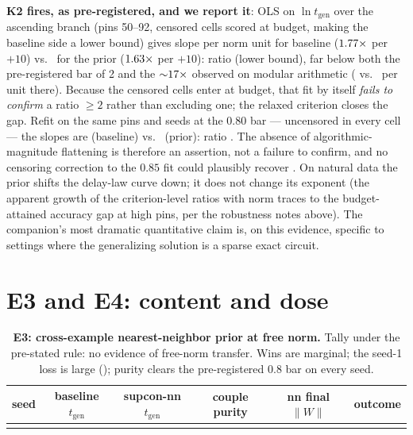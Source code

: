 \documentclass[11pt]{article}
\newcommand{\tgen}{t_{\mathrm{gen}}}
\newcommand{\W}{\lVert W\rVert}
\begin{document}
\textbf{K2 fires, as pre-registered, and we report it}: OLS on $\ln \tgen$ over the ascending
branch (pins 50--92, censored cells scored at budget, making the baseline side a lower bound)
gives slope \pfSlopeBase{} per norm unit for baseline ($1.77\times$ per $+10$) vs.\
\pfSlopeAug{} for the prior ($1.63\times$ per $+10$): ratio \pfSlopeRatio{} (lower bound),
far below both the pre-registered bar of 2 and the ${\sim}17\times$ observed on modular
arithmetic (\pfAlgCeSlope{} vs.\ \pfAlgSupconSlope{} per unit there). Because the censored
cells enter at budget, that fit by itself \emph{fails to confirm} a ratio $\geq 2$ rather than
excluding one; the relaxed criterion closes the gap. Refit on the same pins and seeds at the
$0.80$ bar --- uncensored in every cell --- the slopes are \pfSlopeBaseEighty{} (baseline)
vs.\ \pfSlopeAugEighty{} (prior): ratio \pfSlopeRatioEighty. The absence of
algorithmic-magnitude flattening is therefore an assertion, not a failure to confirm, and no
censoring correction to the $0.85$ fit could plausibly recover \pfAlgFlatten. On natural data
the prior shifts the delay-law curve down; it does not change its exponent (the apparent growth
of the criterion-level ratios with norm traces to the budget-attained accuracy gap at high
pins, per the robustness notes above). The companion's most dramatic quantitative claim is, on
this evidence, specific to settings where the generalizing solution is a sparse exact circuit.

\section{E3 and E4: content and dose}
\label{sec:e3e4}

\begin{table}[t]
\centering\small
\begin{tabular}{cccccc}
\toprule
seed & baseline $\tgen$ & supcon-nn $\tgen$ & couple purity & nn final $\W$ & outcome \\
\midrule
\pfNnTableBody
\bottomrule
\end{tabular}
\caption{\textbf{E3: cross-example nearest-neighbor prior at free norm.} Tally \pfNnTally{}
under the pre-stated rule: no evidence of free-norm transfer. Wins are marginal; the seed-1
loss is large (\pfNnWorstRatio); purity clears the pre-registered $0.8$ bar on every seed.}
\label{tab:nn}
\end{table}
\end{document}
